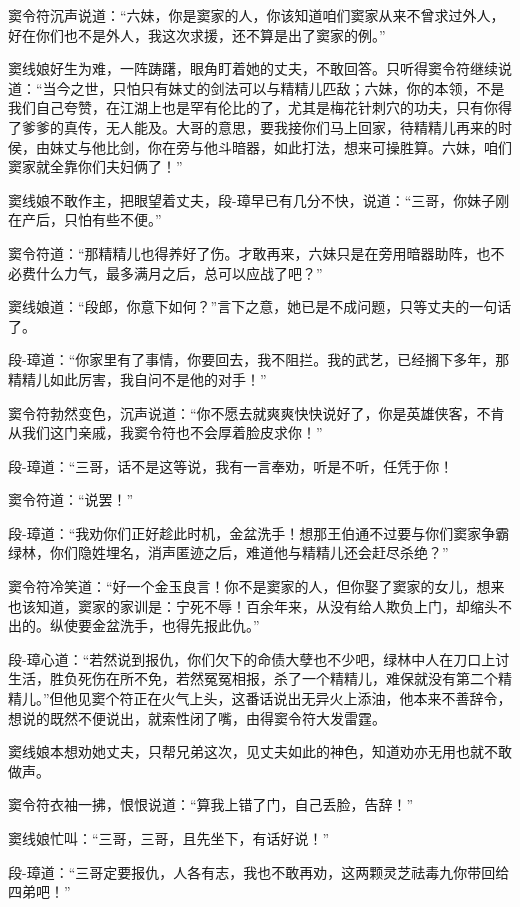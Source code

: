 \documentclass[12pt,oneside]{book}
\begin{document}
窦令符沉声说道：``六妹，你是窦家的人，你该知道咱们窦家从来不曾求过外人，好在你们也不是外人，我这次求援，还不算是出了窦家的例。''

窦线娘好生为难，一阵踌躇，眼角盯着她的丈夫，不敢回答。只听得窦令符继续说道：``当今之世，只怕只有妹丈的剑法可以与精精儿匹敌；六妹，你的本领，不是我们自己夸赞，在江湖上也是罕有伦比的了，尤其是梅花针刺穴的功夫，只有你得了爹爹的真传，无人能及。大哥的意思，要我接你们马上回家，待精精儿再来的时侯，由妹丈与他比剑，你在旁与他斗暗器，如此打法，想来可操胜算。六妹，咱们窦家就全靠你们夫妇俩了！''

窦线娘不敢作主，把眼望着丈夫，段-璋早已有几分不快，说道：``三哥，你妹子刚在产后，只怕有些不便。''

窦令符道：``那精精儿也得养好了伤。才敢再来，六妹只是在旁用暗器助阵，也不必费什么力气，最多满月之后，总可以应战了吧？''

窦线娘道：``段郎，你意下如何？''言下之意，她已是不成问题，只等丈夫的一句话了。

段-璋道：``你家里有了事情，你要回去，我不阻拦。我的武艺，已经搁下多年，那精精儿如此厉害，我自问不是他的对手！''

窦令符勃然变色，沉声说道：``你不愿去就爽爽快快说好了，你是英雄侠客，不肯从我们这门亲戚，我窦令符也不会厚着脸皮求你！''

段-璋道：``三哥，话不是这等说，我有一言奉劝，听是不听，任凭于你！

窦令符道：``说罢！''

段-璋道：``我劝你们正好趁此时机，金盆洗手！想那王伯通不过要与你们窦家争霸绿林，你们隐姓埋名，消声匿迹之后，难道他与精精儿还会赶尽杀绝？''

窦令符冷笑道：``好一个金玉良言！你不是窦家的人，但你娶了窦家的女儿，想来也该知道，窦家的家训是：宁死不辱！百余年来，从没有给人欺负上门，却缩头不出的。纵使要金盆洗手，也得先报此仇。''

段-璋心道：``若然说到报仇，你们欠下的命债大孽也不少吧，绿林中人在刀口上讨生活，胜负死伤在所不免，若然冤冤相报，杀了一个精精儿，难保就没有第二个精精儿。''但他见窦个符正在火气上头，这番话说出无异火上添油，他本来不善辞令，想说的既然不便说出，就索性闭了嘴，由得窦令符大发雷霆。

窦线娘本想劝她丈夫，只帮兄弟这次，见丈夫如此的神色，知道劝亦无用也就不敢做声。

窦令符衣袖一拂，恨恨说道：``算我上错了门，自己丢脸，告辞！''

窦线娘忙叫：``三哥，三哥，且先坐下，有话好说！''

段-璋道：``三哥定要报仇，人各有志，我也不敢再劝，这两颗灵芝祛毒九你带回给四弟吧！''
\end{document}
